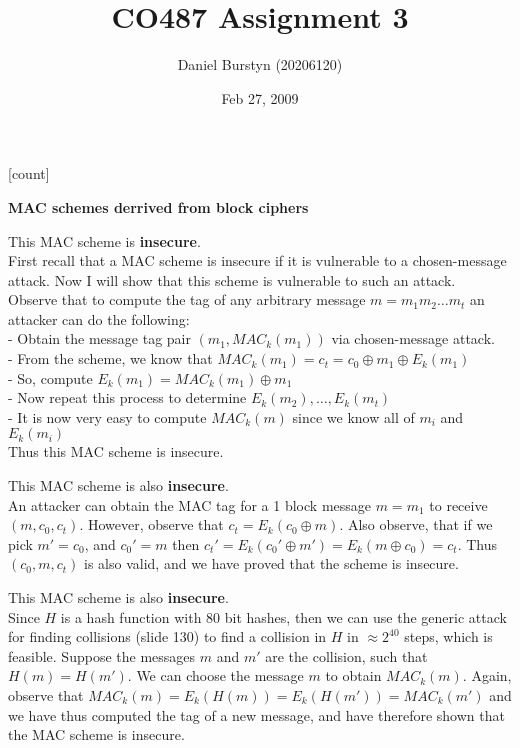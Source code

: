 \documentclass[12pt]{article}
\title{CO487 Assignment 3}
\author{Daniel Burstyn (20206120)}
\date{Feb 27, 2009}
\begin{document}
\maketitle
{}
[count]
\begin{list}{.}{}

\item \textbf{MAC schemes derrived from block ciphers}
\begin{list}{)}{}

\item This MAC scheme is \textbf{insecure}.\\
First recall that a MAC scheme is insecure if it is vulnerable to a
chosen-message attack.  Now I will show that this scheme is vulnerable to such
an attack.\\
Observe that to compute the tag of any arbitrary message $m = m_1m_2\dots m_t$
an attacker can do the following:\\
- Obtain the message tag pair $(m_1,MAC_k(m_1))$ via chosen-message attack.\\
- From the scheme, we know that $MAC_k(m_1) = c_t = c_0 \oplus m_1 \oplus
E_k(m_1)$\\
- So, compute $E_k(m_1) = MAC_k(m_1) \oplus m_1$\\
- Now repeat this process to determine $E_k(m_2), \dots, E_k(m_t)$\\
- It is now very easy to compute $MAC_k(m)$ since we know all of $m_i$ and
$E_k(m_i)$\\
Thus this MAC scheme is insecure.

\item This MAC scheme is also \textbf{insecure}.\\
An attacker can obtain the MAC tag for a 1 block message $m = m_1$ to receive
$(m, c_0, c_t)$.  However, observe that $c_t = E_k(c_0 \oplus m)$.  Also
observe, that if we pick $m' = c_0$, and $c_0' = m$ then $c_t' = E_k(c_0' \oplus
m') = E_k(m \oplus c_0) = c_t$.  Thus $(c_0, m, c_t)$ is also valid, and we have
proved that the scheme is insecure.

\item This MAC scheme is also \textbf{insecure}.\\
Since $H$ is a hash function with 80 bit hashes, then we can use the generic
attack for finding collisions (slide 130) to find a collision in $H$ in $\approx
2^{40}$ steps, which is feasible.  Suppose the messages $m$ and $m'$ are the
collision, such that $H(m) = H(m')$.  We can choose the message $m$ to obtain
$MAC_k(m)$.  Again, observe that $MAC_k(m) = E_k(H(m)) = E_k(H(m')) = MAC_k(m')$
and we have thus computed the tag of a new message, and have therefore shown
that the MAC scheme is insecure.


\end{list}
\end{list}
\end{document}
